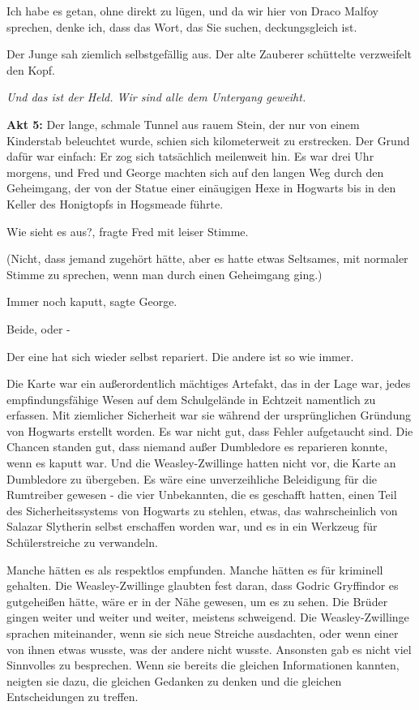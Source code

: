 \glqq{}Ich habe es getan, ohne direkt zu lügen, und da wir hier von Draco Malfoy
sprechen, denke ich, dass das Wort, das Sie suchen, deckungsgleich ist.\grqq{}

Der Junge sah ziemlich selbstgefällig aus. Der alte Zauberer schüttelte
verzweifelt den Kopf.

\glqq{}\emph{Und das ist der Held. Wir sind alle dem Untergang geweiht.}\grqq{}

\textbf{Akt 5:} Der lange, schmale Tunnel aus rauem Stein, der nur von einem
Kinderstab beleuchtet wurde, schien sich kilometerweit zu erstrecken. Der Grund
dafür war einfach: Er zog sich tatsächlich meilenweit hin. Es war drei Uhr
morgens, und Fred und George machten sich auf den langen Weg durch den
Geheimgang, der von der Statue einer einäugigen Hexe in Hogwarts bis in den
Keller des Honigtopfs in Hogsmeade führte.

\glqq{}Wie sieht es aus?\grqq{}, fragte Fred mit leiser Stimme.

(Nicht, dass jemand zugehört hätte, aber es hatte etwas Seltsames, mit normaler
Stimme zu sprechen, wenn man durch einen Geheimgang ging.)

\glqq{}Immer noch kaputt\grqq{}, sagte George.

\glqq{}Beide, oder -\grqq{}

\glqq{}Der eine hat sich wieder selbst repariert. Die andere ist so wie
immer.\grqq{}

Die Karte war ein außerordentlich mächtiges Artefakt, das in der Lage war, jedes
empfindungsfähige Wesen auf dem Schulgelände in Echtzeit namentlich zu erfassen.
Mit ziemlicher Sicherheit war sie während der ursprünglichen Gründung von
Hogwarts erstellt worden. Es war nicht gut, dass Fehler aufgetaucht sind. Die
Chancen standen gut, dass niemand außer Dumbledore es reparieren konnte, wenn es
kaputt war. Und die Weasley-Zwillinge hatten nicht vor, die Karte an Dumbledore
zu übergeben. Es wäre eine unverzeihliche Beleidigung für die Rumtreiber gewesen
- die vier Unbekannten, die es geschafft hatten, einen Teil des
Sicherheitssystems von Hogwarts zu stehlen, etwas, das wahrscheinlich von
Salazar Slytherin selbst erschaffen worden war, und es in ein Werkzeug für
Schülerstreiche zu verwandeln.

Manche hätten es als respektlos empfunden. Manche hätten es für kriminell
gehalten. Die Weasley-Zwillinge glaubten fest daran, dass Godric Gryffindor es
gutgeheißen hätte, wäre er in der Nähe gewesen, um es zu sehen. Die Brüder
gingen weiter und weiter und weiter, meistens schweigend. Die Weasley-Zwillinge
sprachen miteinander, wenn sie sich neue Streiche ausdachten, oder wenn einer
von ihnen etwas wusste, was der andere nicht wusste. Ansonsten gab es nicht viel
Sinnvolles zu besprechen. Wenn sie bereits die gleichen Informationen kannten,
neigten sie dazu, die gleichen Gedanken zu denken und die gleichen
Entscheidungen zu treffen.

